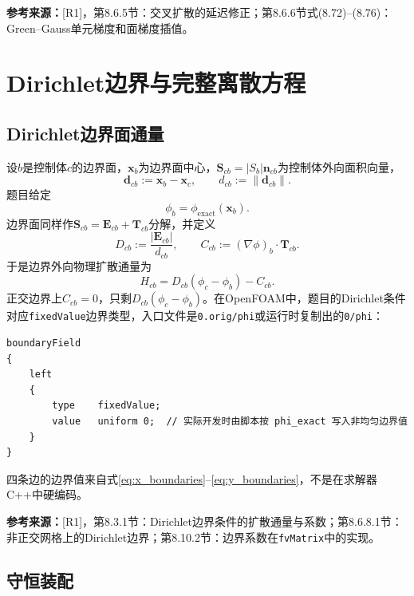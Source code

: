 \documentclass[UTF8,12pt,a4paper]{ctexart}
\numberwithin{equation}{section}
\newcommand{\Rone}{\textnormal{[R1]}}
\newcommand{\source}[1]{%
  \par\smallskip
  \noindent\colorbox{sourcebg}{%
    \parbox{0.955\linewidth}{\footnotesize\color{sourcegray}\textbf{参考来源：}#1}%
  }
  \par\smallskip
}
\begin{document}
\source{\Rone，第8.6.5节：交叉扩散的延迟修正；第8.6.6节式(8.72)--(8.76)：Green--Gauss单元梯度和面梯度插值。}

\newpage
\section{Dirichlet边界与完整离散方程}

\subsection{Dirichlet边界面通量}

设$b$是控制体$c$的边界面，$\bm x_b$为边界面中心，$\bm S_{cb}=|S_b|\bm n_{cb}$为控制体外向面积向量，
\begin{equation}
  \bm d_{cb}:=\bm x_b-\bm x_c,
  \qquad
  d_{cb}:=\lVert\bm d_{cb}\rVert.
  \label{eq:boundary_d}
\end{equation}
题目给定
\begin{equation}
  \phi_b=\phi_{\mathrm{exact}}(\bm x_b).
  \label{eq:boundary_value}
\end{equation}
边界面同样作$\bm S_{cb}=\bm E_{cb}+\bm T_{cb}$分解，并定义
\begin{equation}
  D_{cb}:=\frac{|\bm E_{cb}|}{d_{cb}},
  \qquad
  C_{cb}:=(\nabla\phi)_b\cdot\bm T_{cb}.
  \label{eq:boundary_DC}
\end{equation}
于是边界外向物理扩散通量为
\begin{equation}
  \boxed{
  H_{cb}=D_{cb}(\phi_c-\phi_b)-C_{cb}.}
  \label{eq:boundary_flux}
\end{equation}
正交边界上$C_{cb}=0$，只剩$D_{cb}(\phi_c-\phi_b)$。在OpenFOAM中，题目的Dirichlet条件对应\texttt{fixedValue}边界类型，入口文件是\texttt{0.orig/phi}或运行时复制出的\texttt{0/phi}：
\begin{lstlisting}[style=foam]
boundaryField
{
    left
    {
        type    fixedValue;
        value   uniform 0;  // 实际开发时由脚本按 phi_exact 写入非均匀边界值
    }
}
\end{lstlisting}
四条边的边界值来自式\eqref{eq:x_boundaries}--\eqref{eq:y_boundaries}，不是在求解器C++中硬编码。

\source{\Rone，第8.3.1节：Dirichlet边界条件的扩散通量与系数；第8.6.8.1节：非正交网格上的Dirichlet边界；第8.10.2节：边界系数在\texttt{fvMatrix}中的实现。}

\subsection{守恒装配}
\end{document}
